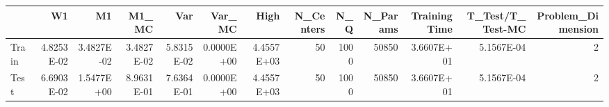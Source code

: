 \begin{tabular}{lrrrrrrrrrrrr}
\toprule
{} &         W1 &         M1 &      M1\_MC &        Var &     Var\_MC &       High &  N\_Centers &   N\_Q &  N\_Params &  Training Time &  T\_Test/T\_Test-MC &  Problem\_Dimension \\
\midrule
Train & 4.8253E-02 & 3.4827E-02 & 3.4827E-02 & 5.8315E-02 & 0.0000E+00 & 4.4557E+03 &         50 &  1000 &     50850 &     3.6607E+01 &        5.1567E-04 &                  2 \\
Test  & 6.6903E-02 & 1.5477E+00 & 8.9631E-01 & 7.6364E-01 & 0.0000E+00 & 4.4557E+03 &         50 &  1000 &     50850 &     3.6607E+01 &        5.1567E-04 &                  2 \\
\bottomrule
\end{tabular}
